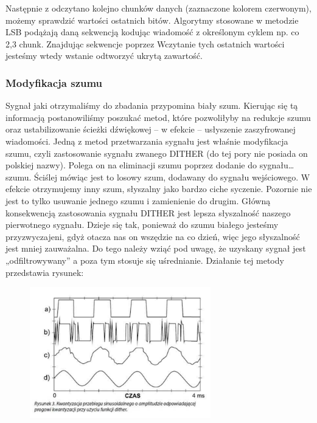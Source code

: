 \documentclass[a4paper,titleauthor]{mwart}
\begin{document}
Następnie z odczytano kolejno chunków danych (zaznaczone kolorem czerwonym), możemy sprawdzić wartości ostatnich bitów. Algorytmy stosowane w metodzie LSB podążają daną sekwencją kodując wiadomość z określonym cyklem np. co 2,3 chunk. Znajdując sekwencje poprzez Wczytanie tych ostatnich wartości jesteśmy wtedy wstanie odtworzyć ukrytą zawartość.\newline\newline

\subsubsection{Modyfikacja szumu}

Sygnał jaki otrzymaliśmy do zbadania przypomina biały szum.\newline \newline
Kierując się tą informacją postanowiliśmy poszukać metod, które pozwoliłyby na redukcje szumu oraz ustabilizowanie ścieżki dźwiękowej – w efekcie – usłyszenie zaszyfrowanej wiadomości. 
\newline \newline
Jedną z metod przetwarzania sygnału jest właśnie modyfikacja szumu, czyli zastosowanie sygnału zwanego DITHER (do tej pory nie posiada on polskiej nazwy). Polega on na eliminacji szumu poprzez dodanie do sygnału… szumu. Ściślej mówiąc jest to losowy szum, dodawany do sygnału wejściowego. W efekcie otrzymujemy inny szum, słyszalny jako bardzo ciche syczenie.\newline \newline
Pozornie nie jest to tylko usuwanie jednego szumu i zamienienie do drugim. Główną konsekwencją zastosowania sygnału DITHER jest lepsza słyszalność naszego pierwotnego sygnału. Dzieje się tak, ponieważ do szumu białego jesteśmy przyzwyczajeni, gdyż otacza nas on wszędzie na co dzień, więc jego słyszalność jest mniej zauważalna. Do tego należy wziąć pod uwagę, że uzyskany sygnał jest „odfiltrowywany” a poza tym stosuje się uśrednianie. 
\newline \newline
Działanie tej metody przedstawia rysunek: 

\begin{figure}[h]
	\centering
	\includegraphics[width=0.7\textwidth]{dither}
\end{figure}
\end{document}
